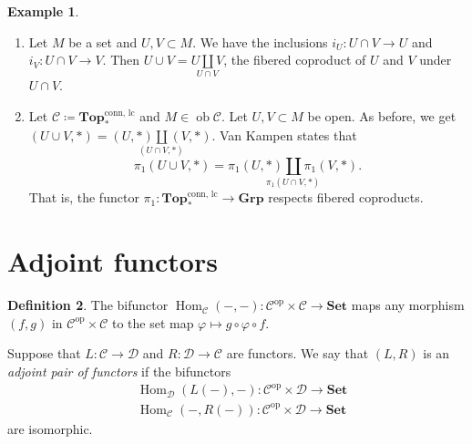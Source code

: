 \documentclass[10pt,letterpaper,cm]{nupset}
\theoremstyle{definition}
\newtheorem{definition}{Definition}[subsection]
\newtheorem{exmp}[definition]{Example}
\theoremstyle{theorem}
\theoremstyle{remark}
\newcommand{\1}{\mathbf{1}}
\renewcommand{\c}{\mathscr{C}}
\renewcommand{\d}{\mathscr{D}}
\newcommand{\0}{\vec 0}
\DeclareMathOperator{\op}{op}
\DeclareMathOperator{\ob}{ob}
\DeclareMathOperator{\Hom}{Hom}
\begin{document}
\begin{exmp} $ $
\begin{enumerate}
\item Let $M$ be a set and $U, V\subset M$. We have the inclusions $i_U : U \cap V \to U$ and $i_V : U \cap V \to V$. Then $U \cup V = \underset{U \cap V}{U \coprod V}$, the fibered coproduct of $U$ and $V$ under $U \cap V$.
\item Let $\c \coloneqq  \mathbf{Top}_{\ast}^{\text{conn, lc}}$ and $M \in \ob \c$. Let $U, V \subset M$ be open. As before, we get $(U \cup V, \ast)= \underset{(U \cap V, {\ast})}{(U, \ast)  \coprod (V, \ast)} $. Van Kampen states that $$\pi_1(U \cup V, \ast) = \underset{\pi_1(U \cap V, \ast)}{\pi_1(U, \ast) \coprod \pi_1(V, \ast)}.$$ That is, the functor $\pi_1: \mathbf{Top}_{\ast}^{\text{conn, lc}}\to \mathbf{Grp}$ respects fibered coproducts. 
\end{enumerate}
\end{exmp}

\section{Adjoint functors}

\begin{definition}
The bifunctor $\Hom_{\c}({-}, {-}) : \c^{\op} \times \c \to \mathbf{Set}$ maps any morphism $(f, g)$ in $\c^{\op} \times \c$ to the set map $\varphi \mapsto g \circ \varphi \circ f$.

Suppose that $L: \c \to \d$ and $R: \d \to \c$ are functors. We say that $(L, R)$ is an \textit{adjoint pair of functors} if the bifunctors
\begin{align*}
& \Hom_{\d}(L(-), -) : \c^{\op} \times \d \to \mathbf{Set}
\\ & \Hom_{\c}(-, R(-)) : \c^{\op} \times \d \to \mathbf{Set} 
\end{align*}
are isomorphic.
\end{definition}
\end{document}
